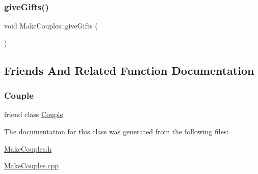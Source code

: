 \subsubsection{\texorpdfstring{give\+Gifts()}{giveGifts()}}
{\footnotesize\ttfamily void Make\+Couples\+::give\+Gifts (\begin{DoxyParamCaption}{ }\end{DoxyParamCaption})}



\subsection{Friends And Related Function Documentation}
\mbox{\label{class_make_couples_a94ec3d69c6a9671cf7d5967498c81a90}} 
\subsubsection{\texorpdfstring{Couple}{Couple}}
{\footnotesize\ttfamily friend class \hyperlink{class_couple}{Couple}\hspace{0.3cm}{\ttfamily [friend]}}



The documentation for this class was generated from the following files\+:\begin{DoxyCompactItemize}
\item 
\hyperlink{_make_couples_8h}{Make\+Couples.\+h}\item 
\hyperlink{_make_couples_8cpp}{Make\+Couples.\+cpp}\end{DoxyCompactItemize}
